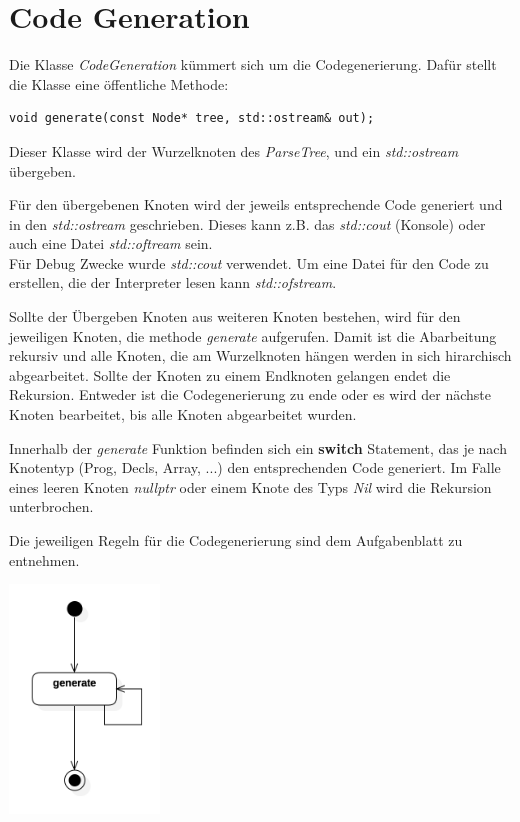 \documentclass[
	a4paper
]{scrreprt}
\begin{document}
    \section{Code Generation}
Die Klasse \textit{CodeGeneration} kümmert sich um die Codegenerierung. Dafür stellt die Klasse eine öffentliche Methode:
\begin{lstlisting}
void generate(const Node* tree, std::ostream& out);
\end{lstlisting}

Dieser Klasse wird der Wurzelknoten des \textit{ParseTree}, und ein \textit{std::ostream} übergeben.

Für den übergebenen Knoten wird der jeweils entsprechende Code generiert und in den \textit{std::ostream} geschrieben. Dieses kann z.B. das \textit{std::cout} (Konsole) oder auch eine Datei \textit{std::oftream} sein.\\
Für Debug Zwecke wurde \textit{std::cout} verwendet. Um eine Datei für den Code zu erstellen, die der Interpreter lesen kann \textit{std::ofstream}.

Sollte der Übergeben Knoten aus weiteren Knoten bestehen, wird für den jeweiligen Knoten, die methode \textit{generate} aufgerufen. Damit ist die Abarbeitung rekursiv und alle Knoten, die am Wurzelknoten hängen werden in sich hirarchisch abgearbeitet. Sollte der Knoten zu einem Endknoten gelangen endet die Rekursion. Entweder ist die Codegenerierung zu ende oder es wird der nächste Knoten bearbeitet, bis alle Knoten abgearbeitet wurden.

Innerhalb der \textit{generate} Funktion befinden sich ein \textbf{switch} Statement, das je nach Knotentyp (Prog, Decls, Array, ...) den entsprechenden Code generiert. Im Falle eines leeren Knoten \textit{nullptr} oder einem Knote des Typs \textit{Nil} wird die Rekursion unterbrochen.

Die jeweiligen Regeln für die Codegenerierung sind dem Aufgabenblatt zu entnehmen. 


\begin{center}
	\includegraphics[width=0.3\textwidth]{./images/code_generation.png}
\end{center}
\end{document}

